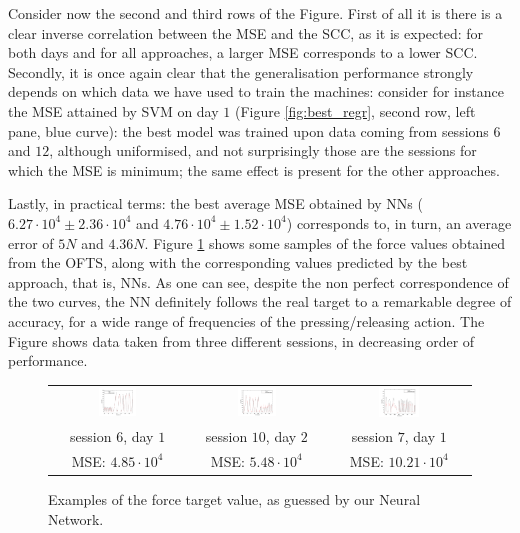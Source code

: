Consider now the second and third rows of the Figure. First of all it
is there is a clear inverse correlation between the MSE and the SCC,
as it is expected: for both days and for all approaches, a larger MSE
corresponds to a lower SCC. Secondly, it is once again clear that the
generalisation performance strongly depends on which data we have used
to train the machines: consider for instance the MSE attained by SVM
on day $1$ (Figure \ref{fig:best_regr}, second row, left pane, blue
curve): the best model was trained upon data coming from sessions $6$
and $12$, although uniformised, and not surprisingly those are the
sessions for which the MSE is minimum; the same effect is present for
the other approaches.

Lastly, in practical terms: the best average MSE obtained by NNs
($6.27\cdot 10^4 \pm 2.36\cdot 10^4$ and $4.76\cdot 10^4 \pm 1.52\cdot
10^4$) corresponds to, in turn, an average error of $5N$ and
$4.36N$. Figure \ref{fig:regression} shows some samples of the force
values obtained from the OFTS, along with the corresponding values
predicted by the best approach, that is, NNs. As one can see, despite
the non perfect correspondence of the two curves, the NN definitely
follows the real target to a remarkable degree of accuracy, for a wide
range of frequencies of the pressing/releasing action. The Figure
shows data taken from three different sessions, in decreasing order of
performance.

\begin{figure}[!ht] \centering
  \begin{tabular}{ccc}
    \includegraphics[width=0.30\textwidth]{figs/fig_regression1} &
    \includegraphics[width=0.30\textwidth]{figs/fig_regression2} &
    \includegraphics[width=0.30\textwidth]{figs/fig_regression3} \\
    session $6$, day $1$ & session $10$, day $2$ & session $7$, day $1$ \\
    MSE: $4.85\cdot 10^4$ & MSE: $5.48\cdot 10^4$ & MSE: $10.21\cdot 10^4$ \\
  \end{tabular}
  \caption{Examples of the force target value, as guessed by our
    Neural Network.}
  \label{fig:regression}
\end{figure}

